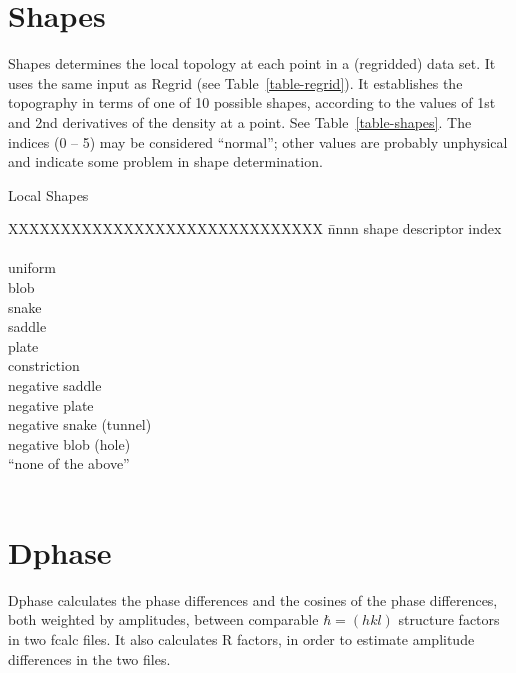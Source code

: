 \documentclass{report}
\begin{document}
{\section {Shapes}
\label{evaluation-shapes}


Shapes determines the local topology at each point in a (regridded) data set.
It uses the same input as Regrid (see Table~\ref{table-regrid}).  
It establishes the topography in terms of one of 10 possible shapes, according
to the values of 1st and 2nd derivatives of the density at a point.
See Table~\ref{table-shapes}.  
The indices (0 -- 5) may be considered ``normal''; other values are probably
unphysical and indicate some problem in shape determination.

\begin{table}[hbt]
\caption {\large Local Shapes}
\label{table-shapes}

\begin{tabbing}
XXXXXXXXXXXXXXXXXXXXXXXXXXXXXX \= nnnn \kill
shape descriptor  \> index \\
\\
uniform  \\
blob  \\
snake  \\
saddle  \\
plate  \\
constriction  \\
negative saddle  \\
negative plate  \\
negative snake (tunnel)   \\
negative blob (hole)   \\
``none of the above''   \\
\\

\end{tabbing} 
\end{table}


\section {Dphase}
\label{evaluation-dphase}

Dphase calculates the phase differences 
and the cosines of the phase differences, both weighted by amplitudes,
between comparable $\hbar = (h k l)$ structure factors in two fcalc files.
It also calculates R factors, in order to estimate amplitude differences
in the two files.

}
\end{document}
